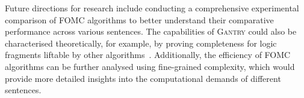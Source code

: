 \documentclass[a4paper,UKenglish,cleveref,autoref,thm-restate]{lipics-v2021}
\newcommand{\Cranetwo}{\textsc{Gantry}}
\begin{document}
Future directions for research include conducting a comprehensive experimental
comparison of FOMC algorithms to better understand their comparative performance
across various sentences. The capabilities of \Cranetwo{} could also be
characterised theoretically, for example, by proving completeness for logic
fragments liftable by other
algorithms~\cite{DBLP:journals/jair/Kuzelka21,DBLP:conf/aaai/TothK23,DBLP:journals/ai/BremenK23}.
Additionally, the efficiency of FOMC algorithms can be further analysed using
fine-grained complexity, which would provide more detailed insights into the
computational demands of different sentences.


\end{document}
